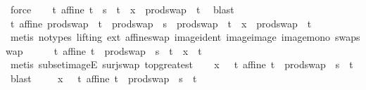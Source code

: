 \begin{isabellebody}
\ force\isanewline
\ \ \isamarkupfalse%
\ {\isachardoublequoteopen}{\isasymforall}t{\isachardot}{\kern0pt}\ affine\ t\ {\isasymand}\ s\ {\isasymsubseteq}\ t\ {\isasymlongrightarrow}\ x\ {\isasymin}\ prod{\isachardot}{\kern0pt}swap\ {\isacharbackquote}{\kern0pt}\ t{\isachardoublequoteclose}\ \isamarkupfalse%
\ blast\isanewline
\ \ \isamarkupfalse%
\ {\isachardoublequoteopen}{\isasymforall}t{\isachardot}{\kern0pt}\ affine\ {\isacharparenleft}{\kern0pt}prod{\isachardot}{\kern0pt}swap\ {\isacharbackquote}{\kern0pt}\ t{\isacharparenright}{\kern0pt}\ {\isasymand}\ prod{\isachardot}{\kern0pt}swap\ {\isacharbackquote}{\kern0pt}\ s\ {\isasymsubseteq}\ prod{\isachardot}{\kern0pt}swap\ {\isacharbackquote}{\kern0pt}\ t\ {\isasymlongrightarrow}\ x\ {\isasymin}\ prod{\isachardot}{\kern0pt}swap\ {\isacharbackquote}{\kern0pt}\ t{\isachardoublequoteclose}\isanewline
\ \ \ \ \isamarkupfalse%
\ {\isacharparenleft}{\kern0pt}metis\ {\isacharparenleft}{\kern0pt}no{\isacharunderscore}{\kern0pt}types{\isacharcomma}{\kern0pt}\ lifting{\isacharparenright}{\kern0pt}\ ext\ affine{\isacharunderscore}{\kern0pt}swap\ image{\isacharunderscore}{\kern0pt}ident\ image{\isacharunderscore}{\kern0pt}image\ image{\isacharunderscore}{\kern0pt}mono\ swap{\isacharunderscore}{\kern0pt}swap{\isacharparenright}{\kern0pt}\ \ \isanewline
\ \ \isamarkupfalse%
\ {\isachardoublequoteopen}{\isasymforall}t{\isachardot}{\kern0pt}\ affine\ t\ {\isasymand}\ prod{\isachardot}{\kern0pt}swap\ {\isacharbackquote}{\kern0pt}\ s\ {\isasymsubseteq}\ t\ {\isasymlongrightarrow}\ x\ {\isasymin}\ t{\isachardoublequoteclose}\ \isanewline
\ \ \ \ \isamarkupfalse%
\ {\isacharparenleft}{\kern0pt}metis\ subset{\isacharunderscore}{\kern0pt}imageE\ surj{\isacharunderscore}{\kern0pt}swap\ top{\isacharunderscore}{\kern0pt}greatest{\isacharparenright}{\kern0pt}\isanewline
\ \ \isamarkupfalse%
\ {\isachardoublequoteopen}x\ {\isasymin}\ {\isasymInter}\ {\isacharbraceleft}{\kern0pt}t{\isachardot}{\kern0pt}\ affine\ t\ {\isasymand}\ prod{\isachardot}{\kern0pt}swap\ {\isacharbackquote}{\kern0pt}\ s\ {\isasymsubseteq}\ t{\isacharbraceright}{\kern0pt}{\isachardoublequoteclose}\ \isamarkupfalse%
\ blast\isanewline
\ \ \isamarkupfalse%
\ \ {\isachardoublequoteopen}x\ {\isasymin}\ {\isasymInter}\ {\isacharbraceleft}{\kern0pt}t{\isachardot}{\kern0pt}\ affine\ t\ {\isasymand}\ prod{\isachardot}{\kern0pt}swap\ {\isacharbackquote}{\kern0pt}\ s\ {\isasymsubseteq}\ t{\isacharbraceright}{\kern0pt}{\isachardoublequoteclose}\ \isamarkupfalse%

\end{isabellebody}
